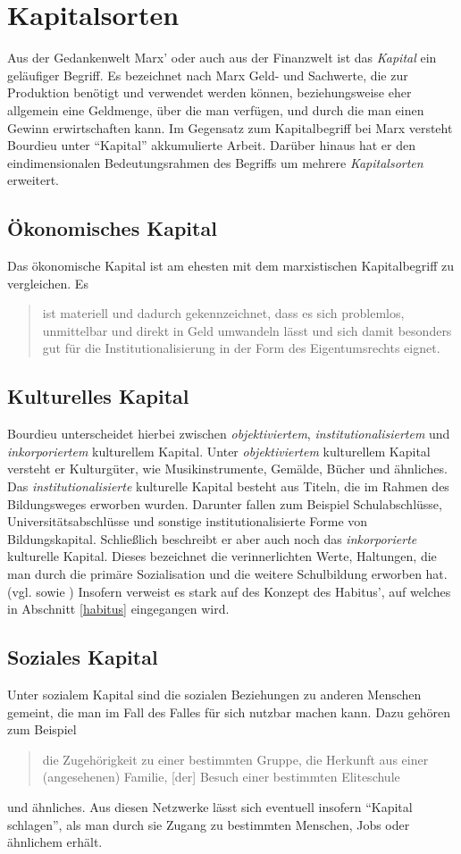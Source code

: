 \documentclass[a4paper, german, oneside]{scrbook}
\begin{document}
\section{Kapitalsorten}
Aus der Gedankenwelt Marx' oder auch aus der Finanzwelt ist das \emph{Kapital} ein geläufiger Begriff. Es bezeichnet nach Marx Geld- und Sachwerte, die zur Produktion benötigt und verwendet werden können, beziehungsweise eher allgemein eine Geldmenge, über die man verfügen, und durch die man einen Gewinn erwirtschaften kann. \parencite{Kapital} Im Gegensatz zum Kapitalbegriff bei Marx versteht Bourdieu unter \enquote{Kapital} akkumulierte Arbeit. \parencite[vgl.][86]{luthje_medium_2008} Darüber hinaus hat er den eindimensionalen Bedeutungsrahmen des Begriffs um mehrere \emph{Kapitalsorten} erweitert. 


\subsection{Ökonomisches Kapital}
Das ökonomische Kapital ist am ehesten mit dem marxistischen Kapitalbegriff zu vergleichen. Es \blockquote[{\cite[86]{luthje_medium_2008}}]{ist materiell und dadurch gekennzeichnet, dass es sich problemlos, unmittelbar und direkt in Geld umwandeln lässt und sich damit besonders gut für die Institutionalisierung in der Form des Eigentumsrechts eignet.}

\subsection{Kulturelles Kapital}
Bourdieu unterscheidet hierbei zwischen \emph{objektiviertem}, \emph{institutionalisiertem} und \emph{inkorporiertem} kulturellem Kapital. Unter \emph{objektiviertem} kulturellem Kapital versteht er Kulturgüter, wie Musikinstrumente, Gemälde, Bücher und ähnliches. Das \emph{institutionalisierte} kulturelle Kapital besteht aus Titeln, die im Rahmen des Bildungsweges erworben wurden. Darunter fallen zum Beispiel Schulabschlüsse, Universitätsabschlüsse und sonstige institutionalisierte Forme von Bildungskapital. Schließlich beschreibt er aber auch noch das \emph{inkorporierte} kulturelle Kapital. Dieses bezeichnet die verinnerlichten Werte, Haltungen, die man durch die primäre Sozialisation und die weitere Schulbildung erworben hat. (vgl. \cite[539f.]{joas_sozialtheorie:_2004} sowie \cite[86f.]{luthje_medium_2008}) Insofern verweist es stark auf des Konzept des Habitus', auf welches in Abschnitt \ref{habitus} eingegangen wird.

\subsection{Soziales Kapital}
Unter sozialem Kapital sind die sozialen Beziehungen zu anderen Menschen gemeint, die man im Fall des Falles für sich nutzbar machen kann. Dazu gehören zum Beispiel \blockquote[{\cite[540]{joas_sozialtheorie:_2004}}]{die Zugehörigkeit zu einer bestimmten Gruppe, die Herkunft aus einer (angesehenen) Familie, [der] Besuch einer bestimmten Eliteschule} und ähnliches. Aus diesen Netzwerke lässt sich eventuell insofern \enquote{Kapital schlagen}, als man durch sie Zugang zu bestimmten Menschen, Jobs oder ähnlichem erhält.
\end{document}
